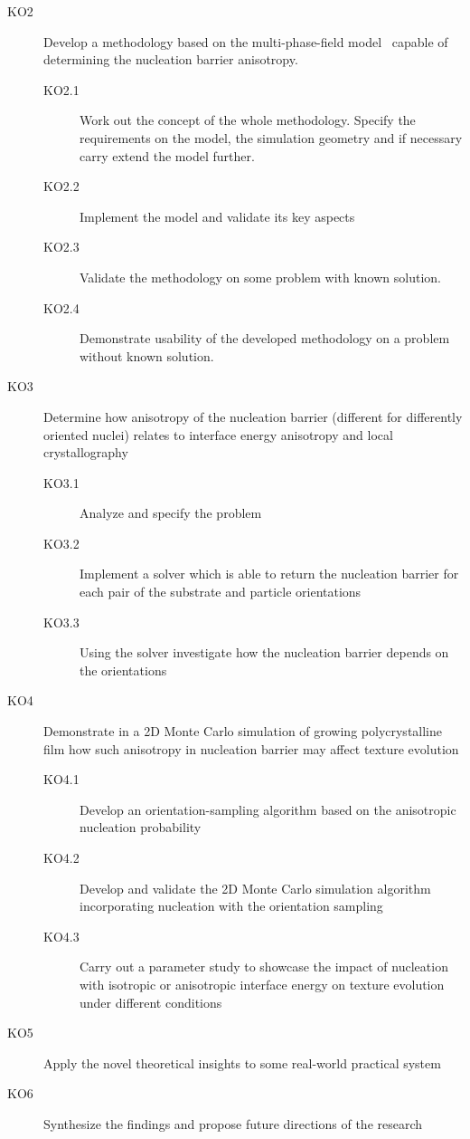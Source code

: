 \begin{description}
	\item[KO2] Develop a methodology based on the multi-phase-field model~\cite{Moelans2008} capable of determining the nucleation barrier anisotropy.
	\begin{description}
		\item[KO2.1] Work out the concept of the whole methodology. Specify the requirements on the model, the simulation geometry and if necessary carry extend the model further.
		\item[KO2.2] Implement the model and validate its key aspects 
		\item[KO2.3] Validate the methodology on some problem with known solution.
		\item[KO2.4] Demonstrate usability of the developed methodology on a problem without known solution.
	\end{description}
	\item[KO3] Determine how anisotropy of the nucleation barrier (different for differently oriented nuclei) relates to interface energy anisotropy and local crystallography
	\begin{description}
		\item[KO3.1] Analyze and specify the problem
		\item[KO3.2] Implement a solver which is able to return the nucleation barrier for each pair of the substrate and particle orientations
		\item[KO3.3] Using the solver investigate how the nucleation barrier depends on the orientations
	\end{description}
	\item[KO4] Demonstrate in a 2D Monte Carlo simulation of growing polycrystalline film how such anisotropy in nucleation barrier may affect texture evolution
	\begin{description}
		\item[KO4.1] Develop an orientation-sampling algorithm based on the anisotropic nucleation probability
		\item[KO4.2] Develop and validate the 2D Monte Carlo simulation algorithm incorporating nucleation with the orientation sampling
		\item[KO4.3] Carry out a parameter study to showcase the impact of nucleation with isotropic or anisotropic interface energy on texture evolution under different conditions
	\end{description}
	\item[KO5] Apply the novel theoretical insights to some real-world practical system
	\item[KO6] Synthesize the findings and propose future directions of the research
\end{description}

